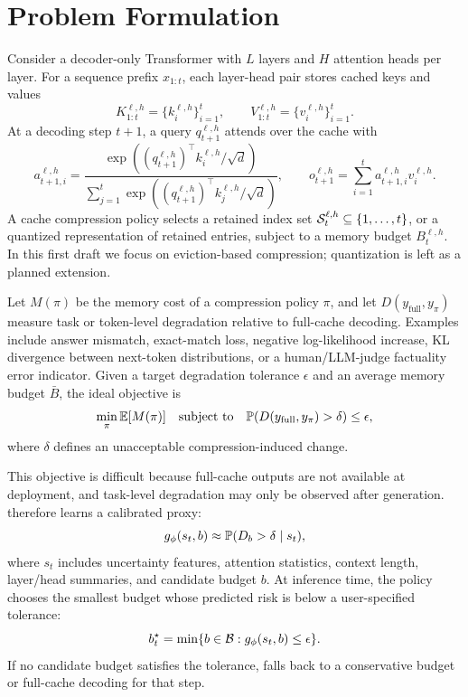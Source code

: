 \section{Problem Formulation}

Consider a decoder-only Transformer with $L$ layers and $H$ attention heads per layer. For a sequence prefix $x_{1:t}$, each layer-head pair stores cached keys and values
\[
K_{1:t}^{\ell,h} = \{k_i^{\ell,h}\}_{i=1}^{t}, \qquad
V_{1:t}^{\ell,h} = \{v_i^{\ell,h}\}_{i=1}^{t}.
\]
At a decoding step $t+1$, a query $q_{t+1}^{\ell,h}$ attends over the cache with
\[
a_{t+1,i}^{\ell,h}
= \frac{\exp((q_{t+1}^{\ell,h})^\top k_i^{\ell,h}/\sqrt{d})}
{\sum_{j=1}^{t} \exp((q_{t+1}^{\ell,h})^\top k_j^{\ell,h}/\sqrt{d})},
\qquad
o_{t+1}^{\ell,h}
= \sum_{i=1}^{t} a_{t+1,i}^{\ell,h} v_i^{\ell,h}.
\]
A cache compression policy selects a retained index set $\mathcal{S}_{t}^{\ell,h}\subseteq \{1,\ldots,t\}$, or a quantized representation of retained entries, subject to a memory budget $B_t^{\ell,h}$. In this first draft we focus on eviction-based compression; quantization is left as a planned extension.

Let $M(\pi)$ be the memory cost of a compression policy $\pi$, and let $D(y_{\mathrm{full}},y_{\pi})$ measure task or token-level degradation relative to full-cache decoding. Examples include answer mismatch, exact-match loss, negative log-likelihood increase, KL divergence between next-token distributions, or a human/LLM-judge factuality error indicator. Given a target degradation tolerance $\epsilon$ and an average memory budget $\bar{B}$, the ideal objective is
\[
\min_{\pi} \mathbb{E}[M(\pi)]
\quad \text{subject to} \quad
\mathbb{P}(D(y_{\mathrm{full}},y_{\pi}) > \delta) \le \epsilon,
\]
where $\delta$ defines an unacceptable compression-induced change.

This objective is difficult because full-cache outputs are not available at deployment, and task-level degradation may only be observed after generation. \uckv{} therefore learns a calibrated proxy:
\[
g_{\phi}(s_t,b) \approx \mathbb{P}(D_b > \delta \mid s_t),
\]
where $s_t$ includes uncertainty features, attention statistics, context length, layer/head summaries, and candidate budget $b$. At inference time, the policy chooses the smallest budget whose predicted risk is below a user-specified tolerance:
\[
b_t^\star = \min \{b \in \mathcal{B} : g_{\phi}(s_t,b) \le \epsilon\}.
\]
If no candidate budget satisfies the tolerance, \uckv{} falls back to a conservative budget or full-cache decoding for that step.
